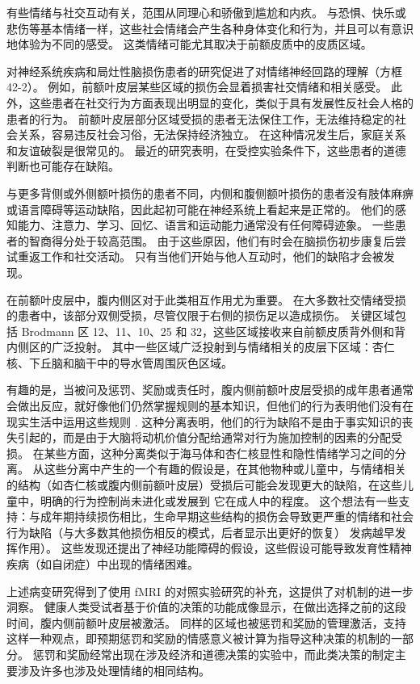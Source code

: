 有些情绪与社交互动有关，范围从同理心和骄傲到尴尬和内疚。 与恐惧、快乐或悲伤等基本情绪一样，这些社会情绪会产生各种身体变化和行为，并且可以有意识地体验为不同的感受。 这类情绪可能尤其取决于前额皮质中的皮质区域。

对神经系统疾病和局灶性脑损伤患者的研究促进了对情绪神经回路的理解（方框 42-2）。 例如，前额叶皮层某些区域的损伤会显着损害社交情绪和相关感受。 此外，这些患者在社交行为方面表现出明显的变化，类似于具有发展性反社会人格的患者的行为。 前额叶皮层部分区域受损的患者无法保住工作，无法维持稳定的社会关系，容易违反社会习俗，无法保持经济独立。 在这种情况发生后，家庭关系和友谊破裂是很常见的。 最近的研究表明，在受控实验条件下，这些患者的道德判断也可能存在缺陷。

与更多背侧或外侧额叶损伤的患者不同，内侧和腹侧额叶损伤的患者没有肢体麻痹或语言障碍等运动缺陷，因此起初可能在神经系统上看起来是正常的。 他们的感知能力、注意力、学习、回忆、语言和运动能力通常没有任何障碍迹象。 一些患者的智商得分处于较高范围。 由于这些原因，他们有时会在脑损伤初步康复后尝试重返工作和社交活动。 只有当他们开始与他人互动时，他们的缺陷才会被发现。

在前额叶皮层中，腹内侧区对于此类相互作用尤为重要。 在大多数社交情绪受损的患者中，该部分双侧受损，尽管仅限于右侧的损伤足以造成损伤。 关键区域包括 Brodmann 区 12、11、10、25 和 32，这些区域接收来自前额皮质背外侧和背内侧区的广泛投射。 其中一些区域广泛投射到与情绪相关的皮层下区域：杏仁核、下丘脑和脑干中的导水管周围灰色区域。

有趣的是，当被问及惩罚、奖励或责任时，腹内侧前额叶皮层受损的成年患者通常会做出反应，就好像他们仍然掌握规则的基本知识，但他们的行为表明他们没有在现实生活中运用这些规则 . 这种分离表明，他们的行为缺陷不是由于事实知识的丧失引起的，而是由于大脑将动机价值分配给通常对行为施加控制的因素的分配受损。 在某些方面，这种分离类似于海马体和杏仁核显性和隐性情绪学习之间的分离。 从这些分离中产生的一个有趣的假设是，在其他物种或儿童中，与情绪相关的结构（如杏仁核或腹内侧前额叶皮层）受损后可能会发现更大的缺陷，在这些儿童中，明确的行为控制尚未进化或发展到 它在成人中的程度。 这个想法有一些支持：与成年期持续损伤相比，生命早期这些结构的损伤会导致更严重的情绪和社会行为缺陷（与大多数其他损伤相反的模式，后者显示出更好的恢复） 发病越早发挥作用）。 这些发现还提出了神经功能障碍的假设，这些假设可能导致发育性精神疾病（如自闭症）中出现的情绪困难。

上述病变研究得到了使用 fMRI 的对照实验研究的补充，这提供了对机制的进一步洞察。 健康人类受试者基于价值的决策的功能成像显示，在做出选择之前的这段时间，腹内侧前额叶皮层被激活。 同样的区域也被惩罚和奖励的管理激活，支持这样一种观点，即预期惩罚和奖励的情感意义被计算为指导这种决策的机制的一部分。 惩罚和奖励经常出现在涉及经济和道德决策的实验中，而此类决策的制定主要涉及许多也涉及处理情绪的相同结构。

